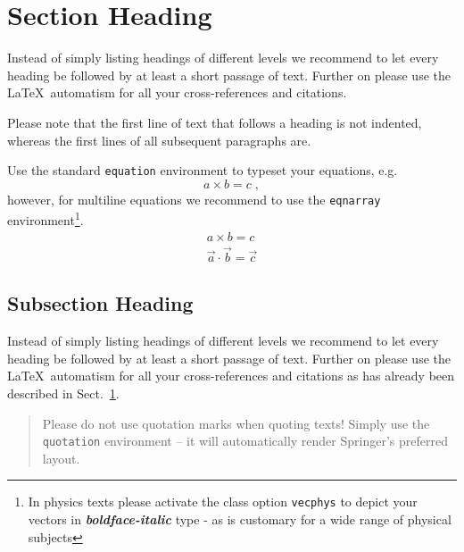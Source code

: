 \documentclass[graybox]{svmult}
\begin{document}
\section{Section Heading}
\label{sec:2}
Instead of simply listing headings of different levels we recommend to
let every heading be followed by at least a short passage of text.
Further on please use the \LaTeX\ automatism for all your
cross-references and citations.

Please note that the first line of text that follows a heading is not indented, whereas the first lines of all subsequent paragraphs are.

Use the standard \verb|equation| environment to typeset your equations, e.g.
%
\begin{equation}
a \times b = c\;,
\end{equation}
%
however, for multiline equations we recommend to use the \verb|eqnarray| environment\footnote{In physics texts please activate the class option \texttt{vecphys} to depict your vectors in \textbf{\itshape boldface-italic} type - as is customary for a wide range of physical subjects}.
\begin{eqnarray}
a \times b = c \nonumber\\
\vec{a} \cdot \vec{b}=\vec{c}
\label{eq:01}
\end{eqnarray}

\subsection{Subsection Heading}
\label{subsec:2}
Instead of simply listing headings of different levels we recommend to
let every heading be followed by at least a short passage of text.
Further on please use the \LaTeX\ automatism for all your
cross-references and citations
as has already been described in Sect.~\ref{sec:2}.

\begin{quotation}
Please do not use quotation marks when quoting texts! Simply use the \verb|quotation| environment -- it will automatically render Springer's preferred layout.
\end{quotation}
\end{document}
